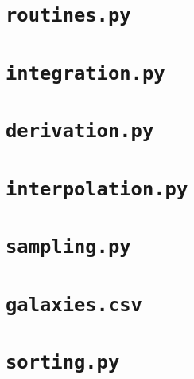 \newpage
\appendix
\section{\texttt{routines.py}} 
\label{sec:routines}




\newpage
\section{\texttt{integration.py}} 
\label{sec:integration}




\newpage
\section{\texttt{derivation.py}} 
\label{sec:derivation}




\newpage
\section{\texttt{interpolation.py}} 
\label{sec:interpolation}





\newpage
\section{\texttt{sampling.py}} 
\label{sec:sampling}





\newpage
\section{\texttt{galaxies.csv}} 
\label{sec:gal_gen}





\newpage
\section{\texttt{sorting.py}} 
\label{sec:sorting}




